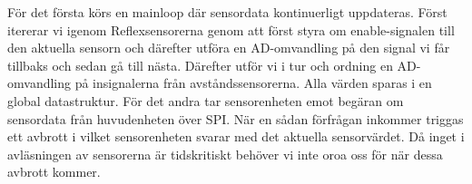 För det första körs en mainloop där sensordata kontinuerligt uppdateras. Först itererar vi igenom Reflexsensorerna genom att först styra om enable-signalen till den aktuella sensorn och därefter utföra en AD-omvandling på den signal vi får tillbaks och sedan gå till nästa. Därefter utför vi i tur och ordning en AD-omvandling på insignalerna från avståndssensorerna. Alla värden sparas i en global datastruktur.
\newline
För det andra tar sensorenheten emot begäran om sensordata från huvudenheten över SPI. När en sådan förfrågan inkommer triggas ett avbrott i vilket sensorenheten svarar med det aktuella sensorvärdet. Då inget i avläsningen av sensorerna är tidskritiskt behöver vi inte oroa oss för när dessa avbrott kommer.
